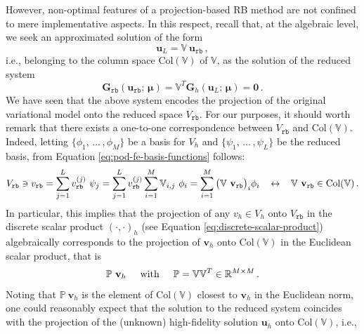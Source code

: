 \documentclass[12pt, a4paper, twoside, openright]{report}
\numberwithin{equation}{chapter}
\theoremstyle{theorem}
\theoremstyle{definition}
\theoremstyle{remark}
\theoremstyle{proposition}
\numberwithin{figure}{chapter}
\newcommand{\bg}[1]{\boldsymbol{#1}}
\begin{document}
		However, non-optimal features of a projection-based RB method are not confined to mere implementative aspects. In this respect, recall that, at the algebraic level, we seek an approximated solution of the form 
		\begin{equation*}
			\mathbf{u}_L = \mathbb{V} ~ \mathbf{u}_{\texttt{rb}} \, ,
		\end{equation*}
		i.e., belonging to the column space $\text{Col}(\mathbb{V})$ of $\mathbb{V}$, as the solution of the reduced system
		\begin{equation*}
			\mathbf{G}_{\texttt{rb}}(\mathbf{u}_{\texttt{rb}}; \, \bg{\mu}) = \mathbb{V}^T \mathbf{G}_h(\mathbf{u}_L; \, \bg{\mu}) = \mathbf{0} \, .
		\end{equation*}
		We have seen that the above system encodes the projection of the original variational model onto the reduced space $V_{\texttt{rb}}$. For our purposes, it should worth remark that there exists a one-to-one correspondence between $V_{\texttt{rb}}$ and $\text{Col}(\mathbb{V})$. Indeed, letting $\big\lbrace \phi_1, \, \ldots \, , \phi_M \big\rbrace$ be a basis for $V_h$ and $\big\lbrace \psi_1, \, \ldots \, , \psi_L \big\rbrace$ be the reduced basis, from Equation \eqref{eq:pod-fe-basis-functions} follows:
		\begin{equation*}
			V_{\texttt{rb}} \ni v_{\texttt{rb}} = \sum_{j = 1}^L v_{\texttt{rb}}^{(j)} ~ \psi_j = \sum_{j = 1}^L v_{\texttt{rb}}^{(j)} \sum_{i = 1}^M \mathbb{V}_{i,j} ~ \phi_i = \sum_{i = 1}^M \big( \mathbb{V} ~ \mathbf{v}_{\texttt{rb}} \big)_i \phi_i \hspace*{0.3cm} \leftrightarrow \hspace*{0.3cm} \mathbb{V} ~ \mathbf{v}_{\texttt{rb}} \in \text{Col}(\mathbb{V}) \, .
		\end{equation*} 
		In particular, this implies that the projection of any $v_h \in V_h$ onto $V_{\texttt{rb}}$ in the discrete scalar product $(\cdot,\cdot)_h$ (see Equation \eqref{eq:discrete-scalar-product}) algebraically corresponds to the projection of $\mathbf{v}_h$ onto $\text{Col}(\mathbb{V})$ in the Euclidean scalar product, that is
		\begin{equation*}
			\mathbb{P} ~ \mathbf{v}_h \hspace*{0.5cm} \text{with} \hspace*{0.5cm} \mathbb{P} = \mathbb{V} \mathbb{V}^T \in \mathbb{R}^{M \times M} \, .
		\end{equation*}
		Noting that $\mathbb{P} ~ \mathbf{v}_h$ is the element of $\text{Col}(\mathbb{V})$ closest to $\mathbf{v}_h$ in the Euclidean norm, one could reasonably expect that the solution to the reduced system coincides with the projection of the (unknown) high-fidelity solution $\mathbf{u}_h$ onto $\text{Col}(\mathbb{V})$, i.e., 
\end{document}

